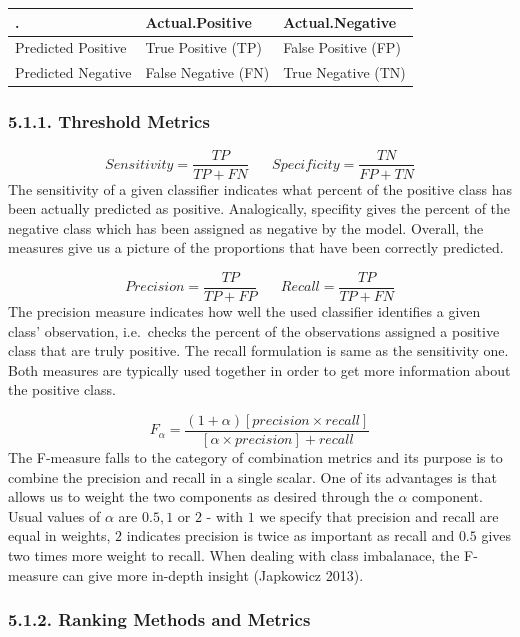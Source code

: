 \documentclass[12pt,]{article}
\begin{document}
\begin{longtable}[]{@{}lll@{}}
\toprule
. & Actual.Positive & Actual.Negative\tabularnewline
\midrule
\endhead
Predicted Positive & True Positive (TP) & False Positive
(FP)\tabularnewline
Predicted Negative & False Negative (FN) & True Negative
(TN)\tabularnewline
\bottomrule
\end{longtable}

\hypertarget{threshold-metrics}{%
\subsubsection{5.1.1. Threshold Metrics}\label{threshold-metrics}}

\[Sensitivity = \frac{TP}{TP + FN}\;\;\;\;\;\;Specificity =\frac{TN}{FP+TN} \]
The sensitivity of a given classifier indicates what percent of the
positive class has been actually predicted as positive. Analogically,
specifity gives the percent of the negative class which has been
assigned as negative by the model. Overall, the measures give us a
picture of the proportions that have been correctly predicted.

\[Precision = \frac{TP}{TP+FP}\;\;\;\;\;\;Recall=\frac{TP}{TP+FN}\] The
precision measure indicates how well the used classifier identifies a
given class' observation, i.e.~checks the percent of the observations
assigned a positive class that are truly positive. The recall
formulation is same as the sensitivity one. Both measures are typically
used together in order to get more information about the positive class.

\[F_\alpha=\frac{(1+\alpha)[precision \times recall]}{[\alpha\times precision] + recall}\]
The F-measure falls to the category of combination metrics and its
purpose is to combine the precision and recall in a single scalar. One
of its advantages is that allows us to weight the two components as
desired through the \(\alpha\) component. Usual values of \(\alpha\) are
\(0.5, 1\) or \(2\) - with \(1\) we specify that precision and recall
are equal in weights, \(2\) indicates precision is twice as important as
recall and \(0.5\) gives two times more weight to recall. When dealing
with class imbalanace, the F-measure can give more in-depth insight
(Japkowicz 2013).

\hypertarget{ranking-methods-and-metrics}{%
\subsubsection{5.1.2. Ranking Methods and
Metrics}\label{ranking-methods-and-metrics}}
\end{document}
